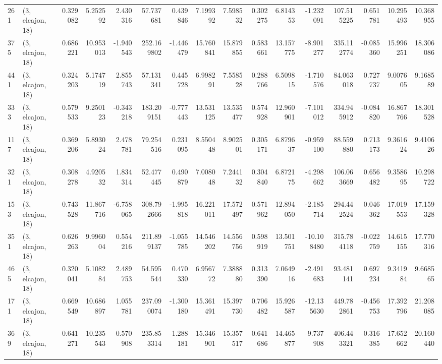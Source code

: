 \begin{tabular}{llrrrrrrrrrrrrrr}
261 &  (3, elcajon, 18) &   0.329082 &   5.252592 &   2.430316 &    57.737681 &   0.439846 &   7.199392 &   7.598532 &  0.302275 &   6.814353 &  -1.232091 &   107.515225 &   0.651781 &  10.295493 &  10.368955 \\
375 &  (3, elcajon, 18) &   0.686221 &  10.953013 &  -1.940543 &   252.169802 &  -1.446479 &  15.760841 &  15.879855 &  0.583661 &  13.157775 &  -8.901277 &   335.112774 &  -0.085360 &  15.996251 &  18.306086 \\
441 &  (3, elcajon, 18) &   0.324203 &   5.174719 &   2.855743 &    57.131341 &   0.445728 &   6.998291 &   7.558528 &  0.288766 &   6.509815 &  -1.710576 &    84.063018 &   0.727737 &   9.007605 &   9.168589 \\
333 &  (3, elcajon, 18) &   0.579533 &   9.250123 &  -0.343218 &   183.209151 &  -0.777443 &  13.531125 &  13.535477 &  0.574928 &  12.960901 &  -7.101012 &   334.945912 &  -0.084820 &  16.867766 &  18.301528 \\
117 &  (3, elcajon, 18) &   0.369206 &   5.893024 &   2.478781 &    79.254516 &   0.231095 &   8.550448 &   8.902501 &  0.305171 &   6.879637 &  -0.959100 &    88.559880 &   0.713173 &   9.361624 &   9.410626 \\
321 &  (3, elcajon, 18) &   0.308278 &   4.920532 &   1.834314 &    52.477445 &   0.490879 &   7.008048 &   7.244132 &  0.304840 &   6.872175 &  -4.298662 &   106.063669 &   0.656482 &   9.358695 &  10.298722 \\
153 &  (3, elcajon, 18) &   0.743528 &  11.867716 &  -6.758065 &   308.792666 &  -1.995818 &  16.221011 &  17.572497 &  0.571962 &  12.894050 &  -2.185714 &   294.442524 &   0.046362 &  17.019553 &  17.159328 \\
351 &  (3, elcajon, 18) &   0.626263 &   9.996004 &   0.554216 &   211.899137 &  -1.055785 &  14.546202 &  14.556756 &  0.598919 &  13.501751 & -10.108480 &   315.784118 &  -0.022759 &  14.615155 &  17.770316 \\
465 &  (3, elcajon, 18) &   0.320041 &   5.108284 &   2.489753 &    54.595544 &   0.470330 &   6.956772 &   7.388880 &  0.313390 &   7.064916 &  -2.491683 &    93.481141 &   0.697234 &   9.341984 &   9.668565 \\
171 &  (3, elcajon, 18) &   0.669549 &  10.686897 &   1.055781 &   237.090074 &  -1.300180 &  15.361491 &  15.397730 &  0.706482 &  15.926587 & -12.135630 &   449.782861 &  -0.456753 &  17.392796 &  21.208085 \\
369 &  (3, elcajon, 18) &   0.641271 &  10.235543 &   0.570908 &   235.853314 &  -1.288181 &  15.346901 &  15.357517 &  0.641686 &  14.465877 &  -9.737908 &   406.443321 &  -0.316385 &  17.652662 &  20.160440 \\

\end{tabular}
